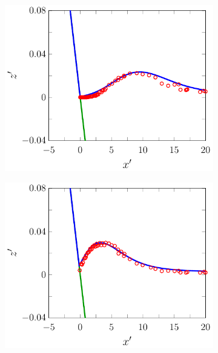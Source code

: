 \begin{figure}
	\centering
	\begin{subfigure}{0.5\textwidth}
		\includegraphics[width=\textwidth]{./chp6/figures/Experiment/Synolakis/H0p0185/FEVM/30s.pdf}
	\end{subfigure}%
	\begin{subfigure}{0.5\textwidth}
		\includegraphics[width=\textwidth]{./chp6/figures/Experiment/Synolakis/H0p0185/FEVM/40s.pdf}
	\end{subfigure}
	\begin{subfigure}{0.5\textwidth}

\end{subfigure}
\end{figure}
